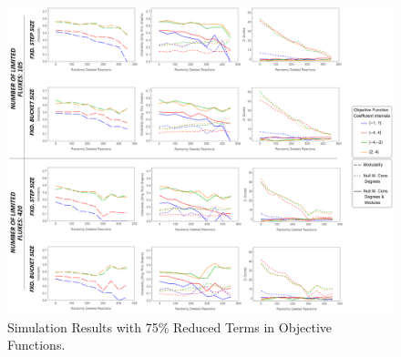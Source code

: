 \begin{landscape}
	\begin{figure}[ht]
		\centering
		\vspace*{-1.5cm}
		\includegraphics[width=1.05\hsize]{../images/results-obj_func_terms_reduced75-simulation-results.png}
		\caption{Simulation Results with 75\% Reduced Terms in Objective Functions.}
		\label{figure-supplements-obj_func-terms-reduced75}
	\end{figure}
\end{landscape}